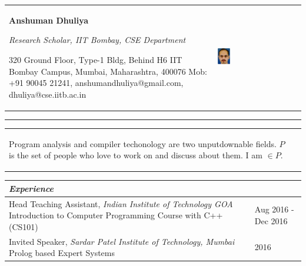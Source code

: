\documentclass[a4paper,12pt]{article}
\newcommand{\Heading}[1]{\textbf{\itshape\normalsize #1}}
\begin{document}
\begin{flushleft}



    \begin{tabular*}{\textwidth}{m{} m{} }
        {\LARGE{}\rule[3ex]{0ex}{0ex}\textbf{Anshuman Dhuliya}}\newline%
        {\rule[3ex]{0ex}{0ex}\large{}\itshape{}Research Scholar, IIT Bombay, CSE Department} \newline%
        \rule[3ex]{0ex}{0ex}{320 Ground Floor, Type-1 Bldg, Behind H6\newline%
IIT Bombay Campus, Mumbai, Maharashtra, 400076\newline%
        Mob: +91 90045 21241, anshumandhuliya@gmail.com, dhuliya@cse.iitb.ac.in}

&  \includegraphics[natwidth=273,natheight=360,width=0.15\textwidth]{images/anshuman1.eps} \\
\end{tabular*}
\rule[1pt]{\textwidth}{2pt}
\begin{tabular*}{\textwidth}{m{} m{} }
{\itshape{}\rule[3ex]{0ex}{0ex}Program analysis and compiler techonology
  are two unputdownable fields.
  $P$ is the set of people who love to work on and discuss about them.
  I am $\in P$.\newline%
    } & \\
\end{tabular*}

    \vspace{3mm}
\begin{tabular}{ m{}| R{0.25\textwidth}}
\multicolumn{2}{l}{\Heading{Experience}} \\
    \hline
    \hline
    \rule[3ex]{0ex}{0ex}Head Teaching Assistant, \textit{Indian Institute of Technology GOA} \newline{}Introduction to Computer Programming Course with C++ (CS101) & Aug 2016 - Dec 2016\\ \hline

    \rule[3ex]{0ex}{0ex}Invited Speaker, \textit{Sardar Patel Institute of Technology, Mumbai} \newline{}Prolog based Expert Systems & 2016\\ \hline


\end{tabular}
\end{flushleft}
\end{document}

